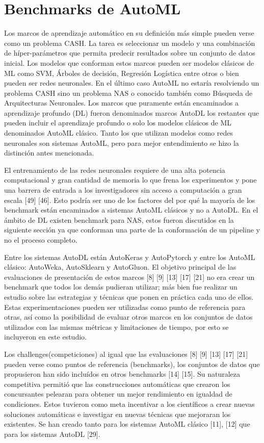 \section{Benchmarks de AutoML}\label{section:bench_AutoML}
Los marcos de aprendizaje automático en su definición más simple pueden verse como un problema CASH. La tarea es seleccionar un modelo y una combinación de 
híper-parámetros que permita predecir resultados sobre un conjunto de datos inicial.  Los modelos que conforman estos marcos pueden ser modelos clásicos de ML como SVM, 
Árboles de decisión, Regresión Logística entre otros o bien pueden ser redes neuronales. En el último caso AutoML no estaría resolviendo un problema CASH sino un 
problema NAS o conocido también como Búsqueda de Arquitecturas Neuronales. Los marcos que puramente están encaminados a aprendizaje profundo (DL) fueron denominados 
marcos AutoDL los restantes que pueden incluir el aprendizaje profundo o solo los modelos clásicos de ML denominados AutoML clásico. Tanto los que utilizan modelos como 
redes neuronales son sistemas AutoML, pero para mejor entendimiento se hizo la distinción antes mencionada.  

El entrenamiento de las redes neuronales requiere de una alta potencia computacional y gran cantidad de memoria lo que frena los experimentos y pone una barrera de 
entrada a los investigadores sin acceso a computación a gran escala [49] [46]. Esto podría ser uno de los factores del por qué la mayoría de los benchmark están 
encaminados a sistemas AutoML clásicos y no a AutoDL. En el ámbito de DL existen benchmark para NAS, estos fueron discutidos en la siguiente sección ya que conforman 
una parte de la conformación de un pipeline y no el proceso completo.

Entre los sistemas AutoDL están AutoKeras y AutoPytorch y entre los AutoML clásico: AutoWeka, AutoSklearn y AutoGluon. El objetivo principal de las evaluaciones de 
presentación de estos marcos [8] [9] [13] [17] [21] no era crear un benchmark que todos los demás pudieran utilizar; más bien fue realizar un estudio sobre las 
estrategias y técnicas que ponen en práctica cada uno de ellos. Estas experimentaciones pueden ser utilizadas como punto de referencia para otras, así como la 
posibilidad de evaluar otros marcos en los conjuntos de datos utilizados con las mismas métricas y limitaciones de tiempo, por esto se incluyeron en este estudio.

Los challenges(competiciones) al igual que las evaluaciones [8] [9] [13] [17] [21] pueden verse como puntos de referencia (benchmarks), los conjuntos de datos que 
propusieron han sido incluídos en otros benchmarks [14] [15]. Su naturaleza competitiva permitió que las construcciones automáticas que crearon los concursantes 
pelearan para obtener un mejor rendimiento en igualdad de condiciones.  Estos tuvieron como meta incentivar a los científicos a crear nuevas soluciones automáticas e 
investigar en nuevas técnicas que mejoraran los existentes. Se han creado tanto para los sistemas AutoML clásico [11], [12] que para los sistemas AutoDL [29].

